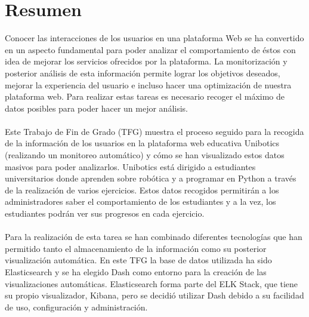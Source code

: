 \newpage
\thispagestyle{plain}			%
\setlength{\parskip}{0pt plus 1.0pt}
\section*{Resumen}
Conocer las interacciones de los usuarios en una plataforma Web se ha convertido en un aspecto fundamental para poder analizar el comportamiento de éstos con idea de mejorar los servicios ofrecidos por la plataforma. La monitorización y posterior análisis de esta información permite lograr los objetivos deseados, mejorar la experiencia del usuario e incluso hacer una optimización de nuestra plataforma web. Para realizar estas tareas es necesario recoger el máximo de datos posibles para poder hacer un mejor análisis.
\\
 \\
Este Trabajo de Fin de Grado (TFG) muestra el proceso seguido para la recogida de la información de los usuarios en la plataforma web educativa Unibotics (realizando un monitoreo automático) y cómo se han visualizado estos datos masivos para poder analizarlos. Unibotics está dirigido a estudiantes universitarios donde aprenden sobre robótica y a programar en Python a través de la realización de varios ejercicios. Estos datos recogidos permitirán a los administradores saber el comportamiento de los estudiantes y a la vez, los estudiantes podrán ver sus progresos en cada ejercicio.
\\
\\
Para la realización de esta tarea se han combinado diferentes tecnologías que han permitido tanto el almacenamiento de la información como su posterior visualización automática. En este TFG la base de datos utilizada ha sido Elasticsearch y se ha elegido Dash como entorno para la creación de las visualizaciones automáticas. Elasticsearch forma parte del ELK Stack, que tiene su propio visualizador, Kibana, pero se decidió utilizar Dash debido a su facilidad de uso, configuración y administración.

